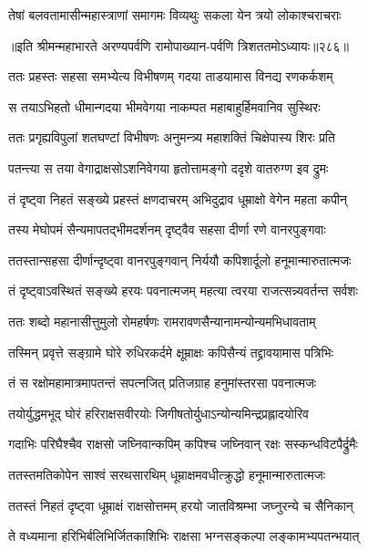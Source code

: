 \twolineshloka
{तेषां बलवतामासीन्महास्त्राणां समागमः}
{विव्यथुः सकला येन त्रयो लोकाश्चराचराः}


॥इति श्रीमन्महाभारते अरण्यपर्वणि रामोपाख्यान-पर्वणि त्रिशततमोऽध्यायः॥२८६॥

\storymeta

\resetShloka



\twolineshloka
{ततः प्रहस्तः सहसा समभ्येत्य विभीषणम्}
{गदया ताडयामास विनद्य रणकर्कशम्}


\twolineshloka
{स तयाऽभिहतो धीमान्गदया भीमवेगया}
{नाकम्पत महाबाहुर्हिमवानिव सुस्थिरः}


\twolineshloka
{ततः प्रगृह्यविपुलां शतघण्टां विभीषणः}
{अनुमन्त्र्य महाशक्तिं चिक्षेपास्य शिरः प्रति}


\twolineshloka
{पतन्त्या स तया वेगाद्राक्षसोऽशनिवेगया}
{हृतोत्तामङ्गो ददृशे वातरुग्ण इव द्रुमः}


\twolineshloka
{तं दृष्ट्वा निहतं सङ्ख्ये प्रहस्तं क्षणदाचरम्}
{अभिदुद्राव धूम्राक्षो वेगेन महता कपीन्}


\twolineshloka
{तस्य मेघोपमं सैन्यमापतद्भीमदर्शनम्}
{दृष्ट्वैव सहसा दीर्णा रणे वानरपुङ्गवाः}


\twolineshloka
{ततस्तान्सहसा दीर्णान्दृष्ट्वा वानरपुङ्गवान्}
{निर्ययौ कपिशार्दूलो हनूमान्मारुतात्मजः}


\twolineshloka
{तं दृष्ट्वाऽवस्थितं सङ्ख्ये हरयः पवनात्मजम्}
{महत्या त्वरया राजत्सन्न्यवर्तन्त सर्वशः}


\twolineshloka
{ततः शब्दो महानासीत्तुमुलो रोमहर्षणः}
{रामरावणसैन्यानामन्योन्यमभिधावताम्}


\twolineshloka
{तस्मिन् प्रवृत्ते सङ्ग्रामे घोरे रुधिरकर्दमे}
{क्षूम्राक्षः कपिसैन्यं तद्द्रावयामास पत्रिभिः}


\twolineshloka
{तं स रक्षोमहामात्रमापतन्तं सपत्नजित्}
{प्रतिजग्राह हनुमांस्तरसा पवनात्मजः}


\twolineshloka
{तयोर्युद्धमभूद् घोरं हरिराक्षसवीरयोः}
{जिगीषतोर्युधाऽन्योन्यमिन्द्रप्रह्लादयोरिव}


\twolineshloka
{गदाभिः परिघैश्चैव राक्षसो जघ्निवान्कपिम्}
{कपिश्च जघ्निवान् रक्षः सस्कन्धविटपैर्द्रुमैः}


\twolineshloka
{ततस्तमतिकोपेन साश्वं सरथसारथिम्}
{धूम्राक्षमवधीत्क्रुद्धो हनूमान्मारुतात्मजः}


\twolineshloka
{ततस्तं निहतं दृष्ट्वा धूम्राक्षं राक्षसोत्तमम्}
{हरयो जातविश्रम्भा जघ्नुरन्ये च सैनिकान्}


\twolineshloka
{ते वध्यमाना हरिभिर्बलिभिर्जितकाशिभिः}
{राक्षसा भग्नसङ्कल्पा लङ्कामभ्यपतन्भयात्}


